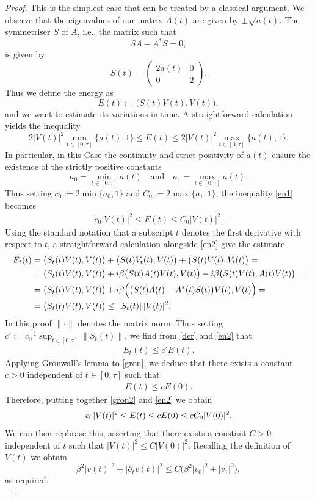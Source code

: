 \documentclass[12pt,oneside,a4paper]{book}
\numberwithin{equation}{section}     %
\theoremstyle{plain}
\theoremstyle{definition}
\begin{document}
\begin{proof}
	This is the simplest case that can be treated by a classical argument.
	We observe that the eigenvalues of our matrix $A(t)$ are given by $\pm \sqrt{a(t)}$. The symmetriser $S$ of $A$, i.e., the matrix such that 
	\[
	SA-A^*S=0,
	\]
	is given by
	\[
	S(t)=\begin{pmatrix}2 a(t) & 0\\ 0 & 2\end{pmatrix}.
	\]
	Thus we define the energy as 
	\[
	E(t):=\Big(S(t)V(t),V(t)\Big),
	\] 
	and we want to estimate its variations in time. A straightforward calculation yields the inequality
	\begin{equation}\label{en1}
	2 |V(t)|^2 \min_{t\in[0,\tau]} \{a(t),1\}\leq E(t)\leq 2|V(t)|^2\max_{t\in[0,\tau]}\{a(t),1\}. 
	\end{equation}
	In particular, in this Case the continuity and strict positivity of $a(t)$ ensure the existence of the strictly positive constants
	\[
	a_0=\min_{t\in[0,\tau]} a(t)\quad\text{and}\quad a_1=\max_{t\in[0,\tau]}a(t).
	\]
	Thus setting $c_0:=2 \min \{a_0,1\}$ and $C_0:=2\max\{a_1,1\}$, the inequality \eqref{en1} becomes
	\begin{align}\label{en2}
	c_0|V(t)|^2\leq E(t)\leq C_0 |V(t)|^2.
	\end{align}
	Using the standard notation that a subscript $t$ denotes the first derivative with respect to $t$, a straightforward calculation alongside \eqref{en2} give the estimate
	\begin{align}\notag
	E_t(t)&=\big( S_t(t)V(t),V(t)\big)+\big(S(t)V_t(t),V(t)\big)+\big(S(t)V(t),V_t(t)\big)=\\\notag
	&=\big( S_t(t)V(t),V(t)\big) +i\beta\big( S(t)A(t)V(t),V(t)\big)-i\beta\big( S(t)V(t),A(t)V(t)\big)=\\\notag
	&=\big( S_t(t)V(t),V(t)\big)+i\beta\Big( \big(S(t)A(t)-A^*(t)S(t)\big)V(t),V(t)\Big)=\\
	&=\big( S_t(t)V(t),V(t)\big)\leq \|S_t(t)\| |V(t)|^2.\label{der}
	\end{align}
	In this proof $\|\cdot\|$ denotes the matrix norm. Thus setting $c':=c_0^{-1}\sup_{t\in [0,\tau]}\|S_t(t)\|$, we find from \eqref{der} and \eqref{en2} that
	\begin{align}\label{gron}
	E_t(t)\leq c' E(t).
	\end{align}
	Applying Gr\"onwall's lemma to \eqref{gron}, we deduce that there exists a constant $c>0$ independent of $t\in[0,\tau]$ such that 
	\begin{align}\label{gron2}
	E(t)\leq c E(0).
	\end{align}
	Therefore, putting together \eqref{gron2} and \eqref{en2} we obtain
	\begin{align}\notag
	c_0 |V(t)|^2\leq E(t)\leq c E(0)\leq c C_0 |V(0)|^2.
	\end{align} 
	We can then rephrase this, asserting that there exists a constant $C>0$ independent of $t$ such that $|V(t)|^2\leq C |V(0)|^2$. Recalling the definition of $V(t)$ we obtain
	\[
	\beta^2|v(t)|^2+|\partial_t v(t)|^2\leq C\big(\beta^2 |v_0|^2 + |v_1|^2\big),
	\]
	as required.\\
	

\end{proof}
\end{document}
